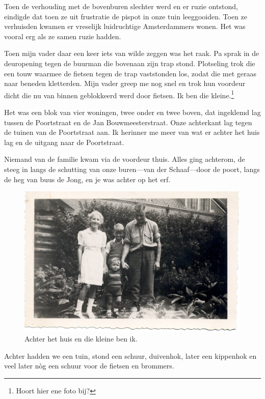\documentclass[10pt,twoside, openright]{memoir}
\begin{document}
Toen de verhouding met de bovenburen slechter werd en er ruzie ontstond, eindigde dat toen ze uit frustratie de pispot in onze tuin leeggooiden. Toen ze verhuisden kwamen er vreselijk luidruchtige Amsterdammers wonen. Het was vooral erg als ze samen ruzie hadden. 

Toen mijn vader daar een keer iets van wilde zeggen was het raak. Pa sprak in de deuropening tegen de buurman die bovenaan zijn trap stond. Plotseling trok die een touw waarmee de fietsen tegen de trap vaststonden los, zodat die met geraas naar beneden kletterden. Mijn vader greep me nog snel en trok hun voordeur dicht die nu van binnen geblokkeerd werd door fietsen. Ik ben die kleine.\footnote{Hoort hier ene foto bij?}

Het was een blok van vier woningen, twee onder en twee boven, dat ingeklemd lag tussen de Poortstraat en de Jan Bouwmeesterstraat. Onze achterkant lag tegen de tuinen van de Poortstraat aan. Ik herinner me meer van wat er achter het huis lag en de uitgang naar de Poortstraat. 

Niemand van de familie kwam via de voordeur thuis. Alles ging achterom, de steeg in langs de schutting van onze buren---van der Schaaf---door de poort, langs de heg van buus de Jong, en je was achter op het erf. 

\begin{figure}
\includegraphics[width=\textwidth]{img/34Rosmstraat2}
\caption*{\footnotesize Achter het huis en die kleine ben ik.}
\end{figure}

Achter hadden we een tuin, stond een schuur, duivenhok, later een kippenhok en veel later nòg een schuur voor de fietsen en brommers. 
\end{document}

